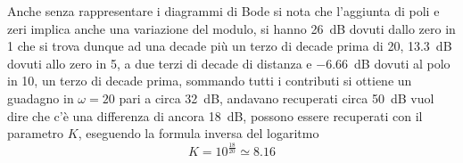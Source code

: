 Anche senza rappresentare i diagrammi di Bode si nota che l'aggiunta di poli e
zeri implica anche una variazione del modulo, si hanno \SI{+26}{\deci\bel}
dovuti dallo zero in 1 che si trova dunque ad una decade più un terzo di decade
prima di 20, \SI{+13.3}{\deci\bel} dovuti allo zero in 5, a due terzi di decade
di distanza e \SI{-6.66}{\deci\bel} dovuti al polo in 10, un terzo di decade
prima, sommando tutti i contributi si ottiene un guadagno in $\omega=20$ pari a
circa \SI{32}{\deci\bel}, andavano recuperati circa \SI{50}{\deci\bel} vuol
dire che c'è una differenza di ancora \SI{18}{\deci\bel}, possono essere
recuperati con il parametro $K$, eseguendo la formula inversa del logaritmo
$$
    K = 10^{\frac{18}{20}} \simeq 8.16
$$